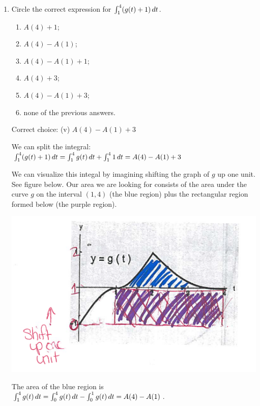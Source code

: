 \documentclass[nooutcomes,handout]{ximera}
\begin{document}
\begin{problem}
\begin{enumerate}
    \item
      Circle the correct expression for $\int_1^4 (g(t) + 1) \,d t$.
      \begin{enumerate}
        \item $A(4) + 1$;
        \item $A(4) - A(1)$;
        \item $A(4) - A(1) + 1$;
        \item $A(4) + 3$;
        \item $A(4) - A(1) + 3$;
        \item none of the previous answers.
      \end{enumerate}
      \begin{freeResponse}
        Correct choice: (v) $A(4) - A(1) + 3$
        
        	We can split the integral: $\int_1^4 (g(t) + 1) \,d t = \int_1^4 g(t) \,d t +\int_1^4  1 \,d t =A(4)-A(1)+3$ 
        
        We can visualize this integal by imagining shifting the graph of $g$ up one unit. See figure below.  Our area we are looking for consists of the area under the curve $g$ on the interval $(1,4)$ (the blue region) plus the rectangular region formed below (the purple region).\\
        

            
              \begin{image}
    \includegraphics[scale = 0.5]{figure3.png}
  \end{image}
            
            The area of the blue region is  $\int_1^4 g(t) \,d t= \int_0^4 g(t) \,d t- \int_0^1 g(t) \,d t=A(4)-A(1)$.
            

\end{freeResponse}
\end{enumerate}
\end{problem}
\end{document}
